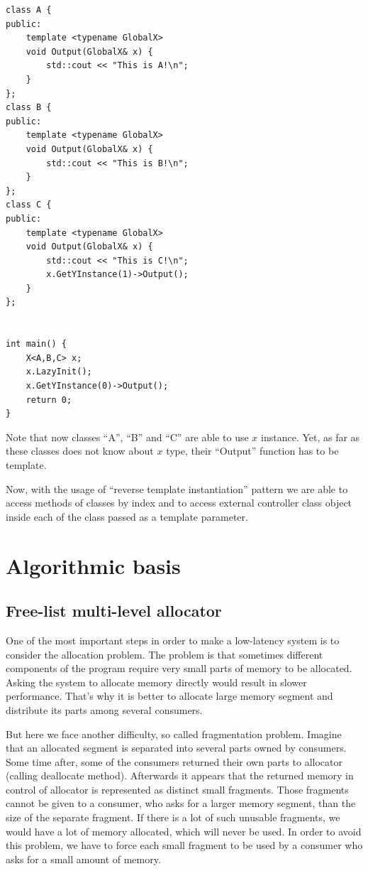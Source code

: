 \documentclass{article}
\begin{document}
\begin{lstlisting}
class A {
public:
    template <typename GlobalX>
    void Output(GlobalX& x) {
        std::cout << "This is A!\n";
    }
};
class B {
public:
    template <typename GlobalX>
    void Output(GlobalX& x) {
        std::cout << "This is B!\n";
    }
};
class C {
public:
    template <typename GlobalX>
    void Output(GlobalX& x) {
        std::cout << "This is C!\n";
        x.GetYInstance(1)->Output();
    }
};


int main() {
    X<A,B,C> x;
    x.LazyInit();
    x.GetYInstance(0)->Output();
    return 0;
}
\end{lstlisting}
Note that now classes ``A'', ``B'' and ``C'' are able to use $x$ instance. Yet, as far as these classes does not know about $x$ type, their ``Output'' function has to be template.

Now, with the usage of ``reverse template instantiation'' pattern we are able to access methods of classes by index and to access external controller class object inside each of the class passed as a template parameter.

\newpage
\section{Algorithmic basis}

\subsection{Free-list multi-level allocator}
\label{free_list_algo}

One of the most important steps in order to make a low-latency system is to consider the allocation problem. The problem is that sometimes different components of the program require very small parts of memory to be allocated. Asking the system to allocate memory directly would result in slower performance. That's why it is better to allocate large memory segment and distribute its parts among several consumers.

But here we face another difficulty, so called fragmentation problem. Imagine that an allocated segment is separated into several parts owned by consumers. Some time after, some of the consumers returned their own parts to allocator (calling deallocate method). Afterwards it appears that the returned memory in control of allocator is represented as distinct small fragments. Those fragments cannot be given to a consumer, who asks for a larger memory segment, than the size of the separate fragment. If there is a lot of such unusable fragments, we would have a lot of memory allocated, which will never be used. In order to avoid this problem, we have to force each small fragment to be used by a consumer who asks for a small amount of memory.
\end{document}
